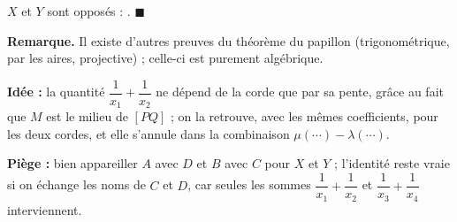 \begin{enumerate}[itemsep=14pt]
  $X$ et $Y$ sont opposés : . $\blacksquare$
\end{enumerate}

\textbf{Remarque.} Il existe d'autres preuves du théorème du papillon (trigonométrique, par les aires, projective) ; celle-ci est purement algébrique.

\textbf{Idée :} la quantité $\dfrac1{x_1}+\dfrac1{x_2}$ ne dépend de la corde que par sa pente, grâce au fait que $M$ est le milieu de $[PQ]$ ; on la retrouve, avec les mêmes coefficients, pour les deux cordes, et elle s'annule dans la combinaison $\mu(\cdots)-\lambda(\cdots)$.

\textbf{Piège :} bien appareiller $A$ avec $D$ et $B$ avec $C$ pour $X$ et $Y$ ; l'identité reste vraie si on échange les noms de $C$ et $D$, car seules les sommes $\dfrac1{x_1}+\dfrac1{x_2}$ et $\dfrac1{x_3}+\dfrac1{x_4}$ interviennent.
